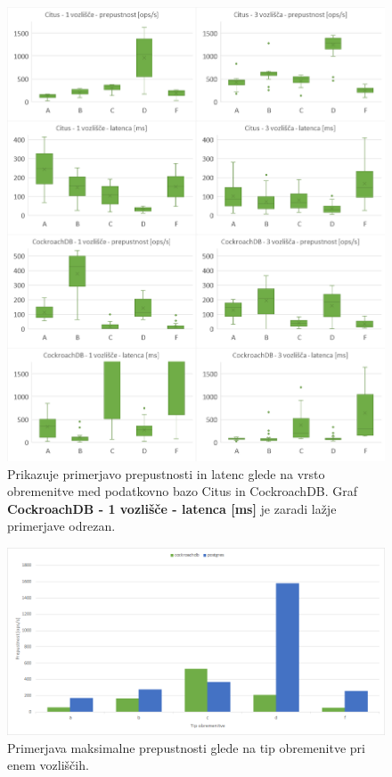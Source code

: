 \documentclass[a4paper, 12pt]{book}
\begin{document}
\begin{figure}[H]
\begin{center}
\includegraphics[width=1\textwidth]{resources/comparison-throughputnlatency-bnw.png}
\end{center}
\caption{Prikazuje primerjavo prepustnosti in latenc glede na vrsto obremenitve med podatkovno bazo Citus in CockroachDB. Graf \textbf{CockroachDB - 1 vozlišče - latenca [ms]} je zaradi lažje primerjave odrezan.}
\label{img_ycsb_results_bnw_comparison}
\end{figure}

\newpage

\begin{figure}[H]
\begin{center}
\includegraphics[width=1\textwidth]{resources/maxThroughput-n1-v2.png}
\end{center}
\caption{Primerjava maksimalne prepustnosti glede na tip obremenitve pri enem vozliščih.}
\label{img_ycsb_results_max_throughput_n1}
\end{figure}
\end{document}
